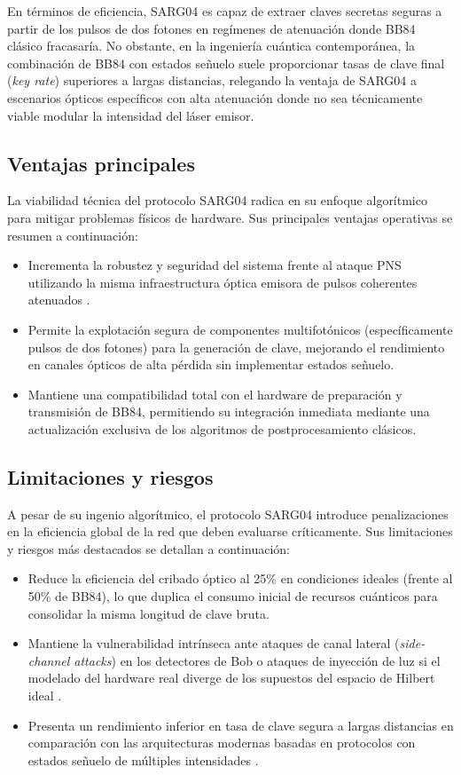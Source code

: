 En términos de eficiencia, SARG04 es capaz de extraer claves secretas seguras a partir de los pulsos de dos fotones en regímenes de atenuación donde BB84 clásico fracasaría. No obstante, en la ingeniería cuántica contemporánea, la combinación de BB84 con estados señuelo suele proporcionar tasas de clave final (\emph{key rate}) superiores a largas distancias, relegando la ventaja de SARG04 a escenarios ópticos específicos con alta atenuación donde no sea técnicamente viable modular la intensidad del láser emisor.

\subsection{Ventajas principales}
La viabilidad técnica del protocolo SARG04 radica en su enfoque algorítmico para mitigar problemas físicos de hardware. Sus principales ventajas operativas se resumen a continuación:
\begin{itemize}
    \item Incrementa la robustez y seguridad del sistema frente al ataque PNS utilizando la misma infraestructura óptica emisora de pulsos coherentes atenuados \citep{scarani2004}.
    \item Permite la explotación segura de componentes multifotónicos (específicamente pulsos de dos fotones) para la generación de clave, mejorando el rendimiento en canales ópticos de alta pérdida sin implementar estados señuelo.
    \item Mantiene una compatibilidad total con el hardware de preparación y transmisión de BB84, permitiendo su integración inmediata mediante una actualización exclusiva de los algoritmos de postprocesamiento clásicos.
\end{itemize}

\subsection{Limitaciones y riesgos}
A pesar de su ingenio algorítmico, el protocolo SARG04 introduce penalizaciones en la eficiencia global de la red que deben evaluarse críticamente. Sus limitaciones y riesgos más destacados se detallan a continuación:
\begin{itemize}
    \item Reduce la eficiencia del cribado óptico al 25\% en condiciones ideales (frente al 50\% de BB84), lo que duplica el consumo inicial de recursos cuánticos para consolidar la misma longitud de clave bruta.
    \item Mantiene la vulnerabilidad intrínseca ante ataques de canal lateral (\emph{side-channel attacks}) en los detectores de Bob o ataques de inyección de luz si el modelado del hardware real diverge de los supuestos del espacio de Hilbert ideal \citep{scarani2009, lydersen2010}.
    \item Presenta un rendimiento inferior en tasa de clave segura a largas distancias en comparación con las arquitecturas modernas basadas en protocolos con estados señuelo de múltiples intensidades \citep{lo2005}.
\end{itemize}

